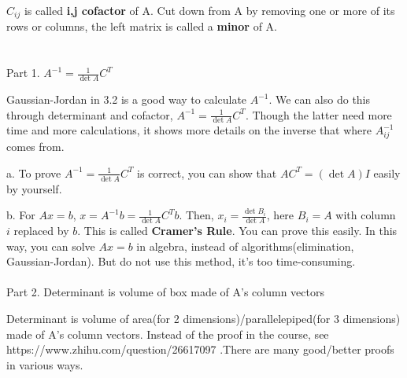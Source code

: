 \documentclass{article}
\begin{document}
\begin{spacing}{1.5}
$C_{ij}$ is called {\bfseries i,j cofactor} of A. Cut down from A by removing one or more of its rows or columns, the left matrix is called a {\bfseries minor} of A.


\section{}
Part 1. $A^{-1}=\frac{1}{\det A}C^T$

Gaussian-Jordan in 3.2 is a good way to calculate $A^{-1}$. We can also do this through determinant and cofactor, $A^{-1}=\frac{1}{\det A}C^T$. Though the latter need more time and more calculations, it shows more details on the inverse that where $A^{-1}_{ij}$ comes from.

a. To prove $A^{-1}=\frac{1}{\det A}C^T$ is correct, you can show that $AC^T=(\det A)I$ easily by yourself.

b. For $Ax=b$, $x=A^{-1}b=\frac{1}{\det A}C^Tb$. Then, $x_i=\frac{\det B_i}{\det A}$, here $B_i = A$ with column $i$ replaced by $b$. This is called {\bfseries Cramer's Rule}. You can prove this easily. In this way, you can solve $Ax=b$ in algebra, instead of algorithms(elimination, Gaussian-Jordan). But do not use this method, it's too time-consuming. 
\\\\ Part 2. Determinant is volume of box made of A's column vectors

Determinant is volume of area(for 2 dimensions)/parallelepiped(for 3 dimensions) made of A's column vectors. Instead of the proof in the course, see https://www.zhihu.com/question/26617097 .There are many good/better proofs in various ways.



\end{spacing}
\end{document}
